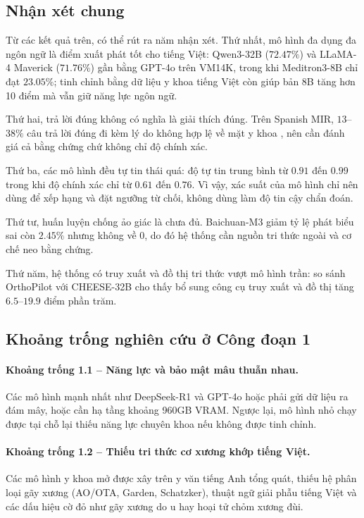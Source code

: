 \subsection{Nhận xét chung}

Từ các kết quả trên, có thể rút ra năm nhận xét. Thứ nhất, mô hình đa dụng đa ngôn ngữ là điểm xuất phát tốt cho tiếng Việt: Qwen3-32B ($72.47\%$) và LLaMA-4 Maverick ($71.76\%$) gần bằng GPT-4o trên VM14K, trong khi Meditron3-8B chỉ đạt $23.05\%$; tinh chỉnh bằng dữ liệu y khoa tiếng Việt còn giúp bản 8B tăng hơn 10 điểm mà vẫn giữ năng lực ngôn ngữ.

Thứ hai, trả lời đúng không có nghĩa là giải thích đúng. Trên Spanish MIR, $13$--$38\%$ câu trả lời đúng đi kèm lý do không hợp lệ về mặt y khoa \cite{spanish_mir_2026}, nên cần đánh giá cả bằng chứng chứ không chỉ độ chính xác.

Thứ ba, các mô hình đều tự tin thái quá: độ tự tin trung bình từ $0.91$ đến $0.99$ trong khi độ chính xác chỉ từ $0.61$ đến $0.76$. Vì vậy, xác suất của mô hình chỉ nên dùng để xếp hạng và đặt ngưỡng từ chối, không dùng làm độ tin cậy chẩn đoán.

Thứ tư, huấn luyện chống ảo giác là chưa đủ. Baichuan-M3 giảm tỷ lệ phát biểu sai còn $2.45\%$ nhưng không về 0, do đó hệ thống cần nguồn tri thức ngoài và cơ chế neo bằng chứng.

Thứ năm, hệ thống có truy xuất và đồ thị tri thức vượt mô hình trần: so sánh OrthoPilot với CHEESE-32B cho thấy bổ sung công cụ truy xuất và đồ thị tăng $6.5$--$19.9$ điểm phần trăm.

\subsection{Khoảng trống nghiên cứu ở Công đoạn 1}

\paragraph{Khoảng trống 1.1 -- Năng lực và bảo mật mâu thuẫn nhau.}
Các mô hình mạnh nhất như DeepSeek-R1 và GPT-4o hoặc phải gửi dữ liệu ra đám mây, hoặc cần hạ tầng khoảng 960GB VRAM. Ngược lại, mô hình nhỏ chạy được tại chỗ lại thiếu năng lực chuyên khoa nếu không được tinh chỉnh.

\paragraph{Khoảng trống 1.2 -- Thiếu tri thức cơ xương khớp tiếng Việt.}
Các mô hình y khoa mở được xây trên y văn tiếng Anh tổng quát, thiếu hệ phân loại gãy xương (AO/OTA, Garden, Schatzker), thuật ngữ giải phẫu tiếng Việt và các dấu hiệu cờ đỏ như gãy xương do u hay hoại tử chỏm xương đùi.

